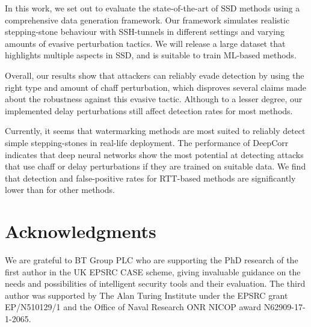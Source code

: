 \documentclass[runningheads,11pt]{llncs}\usepackage[]{graphicx}\usepackage[]{color}
\begin{document}
In this work, we set out to evaluate the state-of-the-art of SSD methods using a comprehensive data generation framework. Our framework simulates realistic stepping-stone behaviour with SSH-tunnels in different  settings and varying amounts of evasive perturbation tactics. 
We will release a large dataset that highlights multiple aspects in SSD, and is suitable to train ML-based methods. 

Overall, our results show that attackers can reliably evade detection by using the right type and amount of chaff perturbation, which disproves several claims made about the robustness against this evasive tactic. Although to a lesser degree, our implemented delay perturbations still affect detection rates for most methods.%

Currently, it seems that watermarking methods are most suited to reliably detect simple stepping-stones in real-life deployment. The performance of DeepCorr indicates that deep neural networks show the most potential at detecting attacks that use chaff or delay perturbations if they are trained on suitable data. We find that detection and false-positive rates for RTT-based methods are significantly lower than for other methods.%

\section{Acknowledgments}

We are grateful to  BT Group PLC who are supporting the PhD research of the first
author in the UK EPSRC CASE scheme, giving invaluable guidance on the needs and possibilities of intelligent security tools and their evaluation. The third author was supported by The Alan Turing Institute under the EPSRC grant EP/N510129/1 and the Office of Naval Research ONR NICOP award N62909-17-1-2065.

\end{document}
